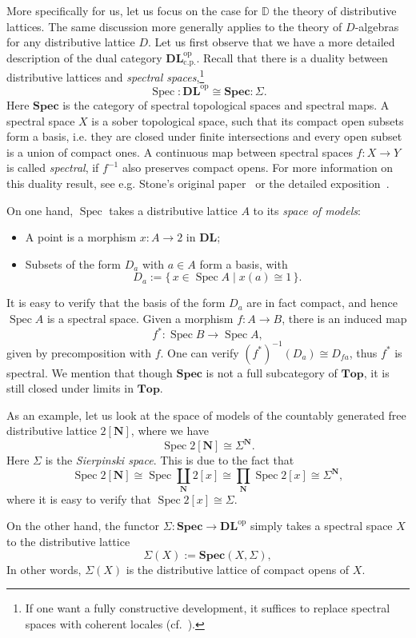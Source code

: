 \documentclass[12pt]{amsart}
\theoremstyle{definition}
\newcommand{\mb}[1]{\mathbf{#1}}
\newcommand{\mbb}[1]{\mathbb{#1}}
\newcommand{\mr}[1]{\mathrm{#1}}
\newcommand{\DL}{\mb{DL}}
\newcommand{\op}{^{\mathrm{op}}}
\newcommand{\inv}{^{\mathrm{-1}}}
\newcommand{\scomp}[2]{\{\,#1\mid#2\,\}}
\newcommand{\cp}{_{\mr{c.p.}}}
\newcommand{\N}{\mb N}
\newcommand{\Topp}{\mb{Top}}
\newcommand{\Spec}{\mb{Spec}}
\newcommand{\spec}{\operatorname{Spec}}
\begin{document}
More specifically for us, let us focus on the case for $\mbb D$ the theory of distributive lattices. The same discussion more generally applies to the theory of $D$-algebras for any distributive lattice $D$. Let us first observe that we have a more detailed description of the dual category $\DL\cp\op$. Recall that there is a duality between distributive lattices and \emph{spectral spaces},\footnote{If one want a fully constructive development, it suffices to replace spectral spaces with coherent locales (cf.~\cite{johnstone1982stone}).}
\[ \spec : \DL\op \cong \Spec : \Sigma. \]
Here $\Spec$ is the category of spectral topological spaces and spectral maps. A spectral space $X$ is a sober topological space, such that its compact open subsets form a basis, i.e. they are closed under finite intersections and every open subset is a union of compact ones. A continuous map between spectral spaces $f : X \to Y$ is called \emph{spectral}, if $f\inv$ also preserves compact opens. For more information on this duality result, see e.g. Stone's original paper~\cite{stone1938topological} or the detailed exposition~\cite{bezhanishvili2010bitopological}.

On one hand, $\spec$ takes a distributive lattice $A$ to its \emph{space of models}:
\begin{itemize}
  \item A point is a morphism $x : A \to 2$ in $\DL$;
  \item Subsets of the form $D_a$ with $a\in A$ form a basis, with 
  \[ D_a := \scomp{x \in \spec A}{x(a) \cong 1}. \]
\end{itemize}
It is easy to verify that the basis of the form $D_a$ are in fact compact, and hence $\spec A$ is a spectral space. Given a morphism $f : A \to B$, there is an induced map
\[ f^* : \spec B \to \spec A, \]
given by precomposition with $f$. One can verify $(f^*)\inv(D_a) \cong D_{fa}$, thus $f^*$ is spectral. We mention that though $\Spec$ is not a full subcategory of $\Topp$, it is still closed under limits in $\Topp$. 

As an example, let us look at the space of models of the countably generated free distributive lattice $2[\N]$, where we have 
\[ \spec 2[\N] \cong \Sigma^\N. \] 
Here $\Sigma$ is the \emph{Sierpinski space}. This is due to the fact that
\[ \spec 2[\N] \cong \spec\coprod_{\N} 2[x] \cong \prod_{\N} \spec 2[x] \cong \Sigma^\N, \]
where it is easy to verify that $\spec 2[x] \cong \Sigma$. 

On the other hand, the functor $\Sigma : \Spec \to \DL\op$ simply takes a spectral space $X$ to the distributive lattice 
\[ \Sigma(X) := \Spec(X,\Sigma), \]
In other words, $\Sigma(X)$ is the distributive lattice of compact opens of $X$.
\end{document}
